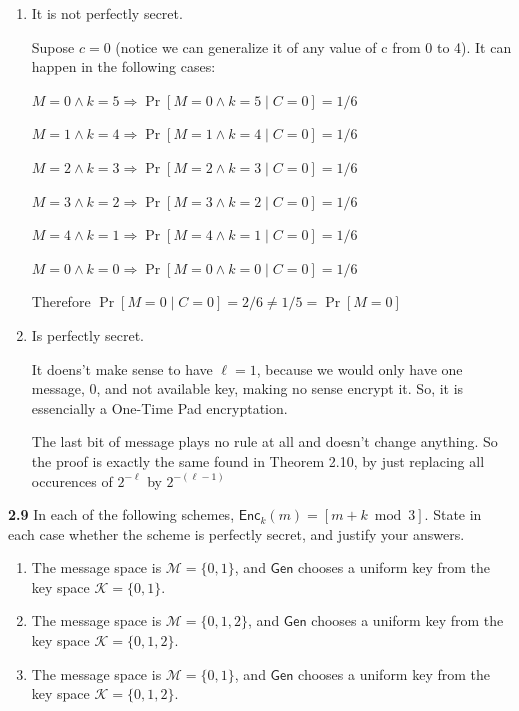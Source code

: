 \begin{enumerate}
	\item[(a)] It is not perfectly secret.

Supose $c = 0$ (notice we can generalize it of any value of c from 0 to 4). It can happen in the following cases:

$M = 0 \land k = 5 \Rightarrow \Pr[M = 0 \land k = 5 \mid C = 0] = 1 / 6$

$M = 1 \land k = 4 \Rightarrow \Pr[M = 1 \land k = 4 \mid C = 0] = 1 / 6$

$M = 2 \land k = 3 \Rightarrow \Pr[M = 2 \land k = 3 \mid C = 0] = 1 / 6$

$M = 3 \land k = 2 \Rightarrow \Pr[M = 3 \land k = 2 \mid C = 0] = 1 / 6$

$M = 4 \land k = 1 \Rightarrow \Pr[M = 4 \land k = 1 \mid C = 0] = 1 / 6$

$M = 0 \land k = 0 \Rightarrow \Pr[M = 0 \land k = 0 \mid C = 0] = 1 / 6$

Therefore $\Pr[M = 0 \mid C = 0] = 2 / 6 \ne 1 / 5 =  \Pr[M = 0]$

	\item[(b)] Is perfectly secret.
		
It doens't make sense to have $\ell = 1$, because we would only have one message, $0$, and not available key, making no sense encrypt it. So, it is essencially a One-Time Pad encryptation.

The last bit of message plays no rule at all and doesn't change anything. So the proof is exactly the same found in Theorem 2.10, by just replacing all occurences of $2^{-\ell}$ by $2^{-(\ell -1)}$

\end{enumerate}

\newpage
\noindent
\textbf{2.9} \hspace{1em} In each of the following schemes, $\textsf{Enc}_k(m) = [m + k \bmod 3]$. State in each case whether the scheme is perfectly secret, and justify your answers.
\vspace{1em}


\begin{enumerate}
	\item[(a)] The message space is $\mathcal{M} = \{0, 1\}$, and $\textsf{Gen}$ chooses a uniform key from the key space $\mathcal{K} = \{0, 1\}$.
	
	\item[(b)] The message space is $\mathcal{M} = \{0, 1, 2\}$, and $\textsf{Gen}$ chooses a uniform key from the key space $\mathcal{K} = \{0, 1, 2\}$.
	
	\item[(c)] The message space is $\mathcal{M} = \{0, 1\}$, and $\textsf{Gen}$ chooses a uniform key from the key space $\mathcal{K} = \{0, 1, 2\}$.
\end{enumerate}

